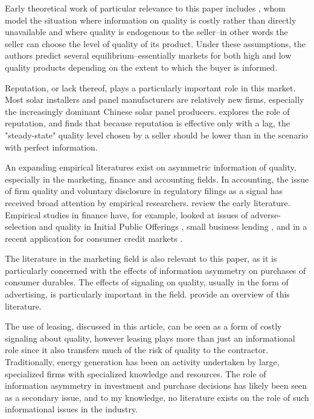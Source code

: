 \documentclass[a4paper]{article}
\begin{document}
Early theoretical work of particular relevance to this paper includes \citet{chan_prices_1982}, whom model the situation where information on quality is costly rather than directly unavailable and where quality is endogenous to the seller--in other words the seller can choose the level of quality of its product. Under these assumptions, the authors predict several equilibrium--essentially markets for both high and low quality products depending on the extent to which the buyer is informed.

Reputation, or lack thereof, plays a particularly important role in this market. Most solar installers and panel manufacturers are relatively new firms, especially the increasingly dominant Chinese solar panel producers. \citet{shapiro_consumer_1982} explores the role of reputation, and finds that because reputation is effective only with a lag, the "steady-state" quality level chosen by a seller should be lower than in the scenario with perfect information.

An expanding empirical literatures exist on asymmetric information of quality, especially in the marketing, finance and accounting fields. In accounting, the issue of firm quality and voluntary disclosure in regulatory filings as a signal has received broad attention by empirical researchers. \citet{healy_information_2001} review the early literature. Empirical studies in finance have, for example, looked at issues of adverse-selection and quality in Initial Public Offerings \citep{michaely_pricing_1994}, small business lending \citep{petersen_benefits_1994}, and in a recent application for consumer credit markets \citep{dobbie_information_2013}.

The literature in the marketing field is also relevant to this paper, as it is particularly concerned with the effects of information asymmetry on purchases of consumer durables. The effects of signaling on quality, usually in the form of advertising, is particularly important in the field. \citet{kirmani_no_2000} provide an overview of this literature.

The use of leasing, discussed in this article, can be seen as a form of costly signaling about quality, however leasing plays more than just an informational role since it also transfers much of the risk of quality to the contractor. Traditionally, energy generation has been an activity undertaken by large, specialized firms with specialized knowledge and resources. The role of information asymmetry in investment and purchase decisions has likely been seen as a secondary issue, and to my knowledge, no literature exists on the role of such informational issues in the industry.
\end{document}
